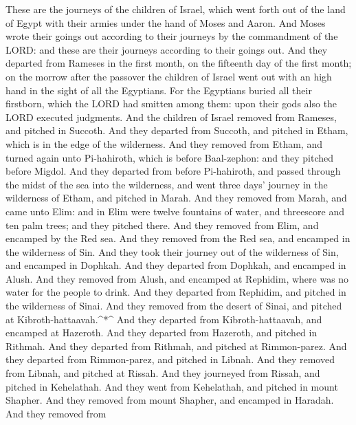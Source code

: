  These are the journeys of the children of Israel, which
went forth out of the land of Egypt with their armies under the hand of
Moses and Aaron.  And Moses wrote their goings out according
to their journeys by the commandment of the LORD: and these are their
journeys according to their goings out.  And they departed
from Rameses in the first month, on the fifteenth day of the first
month; on the morrow after the passover the children of Israel went out
with an high hand in the sight of all the Egyptians.  For
the Egyptians buried all their firstborn, which the LORD had smitten
among them: upon their gods also the LORD executed judgments.
 And the children of Israel removed from Rameses, and
pitched in Succoth.  And they departed from Succoth, and
pitched in Etham, which is in the edge of the wilderness. 
And they removed from Etham, and turned again unto Pi-hahiroth, which is
before Baal-zephon: and they pitched before Migdol.  And
they departed from before Pi-hahiroth, and passed through the midst of
the sea into the wilderness, and went three days' journey in the
wilderness of Etham, and pitched in Marah.  And they removed
from Marah, and came unto Elim: and in Elim were twelve fountains of
water, and threescore and ten palm trees; and they pitched there.
 And they removed from Elim, and encamped by the Red sea.
 And they removed from the Red sea, and encamped in the
wilderness of Sin.  And they took their journey out of the
wilderness of Sin, and encamped in Dophkah.  And they
departed from Dophkah, and encamped in Alush.  And they
removed from Alush, and encamped at Rephidim, where was no water for the
people to drink.  And they departed from Rephidim, and
pitched in the wilderness of Sinai.  And they removed from
the desert of Sinai, and pitched at Kibroth-hattaavah.\^{}*\^{}
 And they departed from Kibroth-hattaavah, and encamped at
Hazeroth.  And they departed from Hazeroth, and pitched in
Rithmah.  And they departed from Rithmah, and pitched at
Rimmon-parez.  And they departed from Rimmon-parez, and
pitched in Libnah.  And they removed from Libnah, and
pitched at Rissah.  And they journeyed from Rissah, and
pitched in Kehelathah.  And they went from Kehelathah, and
pitched in mount Shapher.  And they removed from mount
Shapher, and encamped in Haradah.  And they removed from
